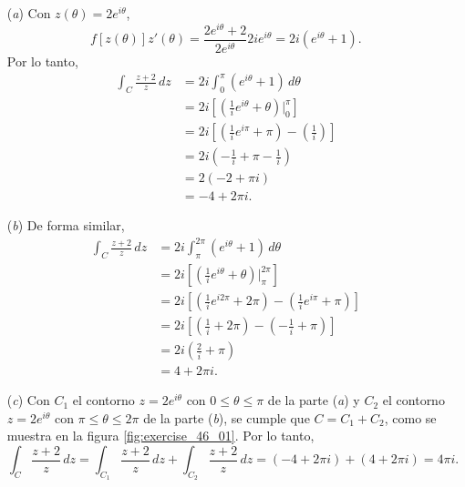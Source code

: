 \documentclass[a4paper]{report}
\begin{document}
\begin{itemize}
 \item[(\textit{a})] Con  \(z(\theta)=2e^{i\theta}\),
 \[
  f[z(\theta)]z'(\theta)=\frac{2e^{i\theta}+2}{2e^{i\theta}}2ie^{i\theta}=2i(e^{i\theta}+1).
 \]
 Por lo tanto,
 \begin{align*}
  \int_C\frac{z+2}{z}\,dz&=2i\int_0^\pi(e^{i\theta}+1)\,d\theta\\
   &=2i\left[\left(\frac{1}{i}e^{i\theta}+\theta\right)\bigg|_0^\pi\right]\\
   &=2i\left[\left(\frac{1}{i}e^{i\pi}+\pi\right)-\left(\frac{1}{i}\right)\right]\\
   &=2i\left(-\frac{1}{i}+\pi-\frac{1}{i}\right)\\
   &=2\left(-2+\pi i\right)\\
   &=-4+2\pi i.
 \end{align*}
 \item[(\textit{b})] De forma similar,
 \begin{align*}
  \int_C\frac{z+2}{z}\,dz&=2i\int_\pi^{2\pi}(e^{i\theta}+1)\,d\theta\\
   &=2i\left[\left(\frac{1}{i}e^{i\theta}+\theta\right)\bigg|_\pi^{2\pi}\right]\\
   &=2i\left[\left(\frac{1}{i}e^{i2\pi}+2\pi\right)-\left(\frac{1}{i}e^{i\pi}+\pi\right)\right]\\
   &=2i\left[\left(\frac{1}{i}+2\pi\right)-\left(-\frac{1}{i}+\pi\right)\right]\\
   &=2i\left(\frac{2}{i}+\pi\right)\\
   &=4+2\pi i.
 \end{align*}
 \item[(\textit{c})] Con \(C_1\) el contorno \(z=2e^{i\theta}\) con \(0\leq\theta\leq\pi\) de la parte (\textit{a}) y \(C_2\) el contorno \(z=2e^{i\theta}\) con \(\pi\leq\theta\leq2\pi\) de la parte (\textit{b}), se cumple que \(C=C_1+C_2\), como se muestra en la figura \ref{fig:exercise_46_01}. Por lo tanto,
 \[
  \int_C\frac{z+2}{z}\,dz=\int_{C_1}\frac{z+2}{z}\,dz+\int_{C_2}\frac{z+2}{z}\,dz
  =(-4+2\pi i)+(4+2\pi i)=4\pi i.
 \]
 \begin{figure}[!htb]
  \begin{minipage}[c]{0.35\textwidth}

\end{minipage}
\end{figure}
\end{itemize}
\end{document}
